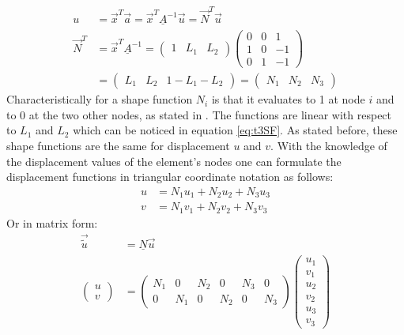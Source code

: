   \begin{align}\label{eq:t3SF}
  u &= \vec{x}^T \vec{a} = \vec{x}^T \underline{A}^{-1}\vec{u} = \vec{N}^T\vec{u} \nonumber\\
  \vec{N}^T &= \vec{x}^T \underline{A}^{-1} =
  \begin{pmatrix}
  1 & L_1 & L_2
  \end{pmatrix} \begin{pmatrix}
  0 & 0 & 1\\
  1 & 0 & -1\\
  0 & 1 & -1
  \end{pmatrix} \nonumber\\
  &= \begin{pmatrix}
  L_1 & L_2 & 1-L_1-L_2
  \end{pmatrix} = \begin{pmatrix}
  N_1 & N_2 & N_3
  \end{pmatrix}
  \end{align}
  Characteristically for a shape function $N_i$ is that it evaluates to 1 at node $i$ and to 0 at the two other nodes, as stated in \cite{steinke2005finite}. The functions are linear with respect to $L_1$ and $L_2$ which can be noticed in equation \eqref{eq:t3SF}. As stated before, these shape functions are the same for displacement $u$ and $v$. With the knowledge of the displacement values of the element's nodes one can formulate the displacement functions in triangular coordinate notation as follows:
  \begin{align}
  u &= N_1 u_1 + N_2 u_2 + N_3 u_3 \nonumber\\
  v &= N_1 v_1 + N_2 v_2 + N_3 v_3
  \end{align}
  Or in matrix form:
  \begin{align} \label{eq:t3u=Nu}
  \vec{\tilde{u}} &= \underline{N} \vec{u} \nonumber\\
  \begin{pmatrix}
  u \\ v
  \end{pmatrix} &= \begin{pmatrix}
  N_1 & 0 & N_2 & 0 & N_3 & 0 \\
  0 & N_1 & 0 & N_2 & 0 & N_3
  \end{pmatrix} \begin{pmatrix}
  u_1 \\ v_1 \\ u_2 \\ v_2 \\ u_3 \\ v_3
  \end{pmatrix}
  \end{align}
